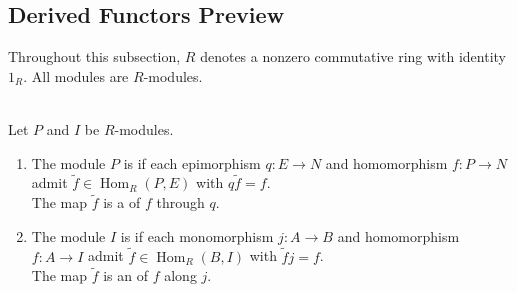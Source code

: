 \subsection{Derived Functors Preview}

Throughout this subsection, $R$ denotes a nonzero commutative ring with identity $1_R$. All modules are $R$-modules.

\begin{definition} \label{def:projective-injective-modules} \\
Let $P$ and $I$ be $R$-modules.
\begin{enumerate}[label=(\roman*)]
\setlength{\itemsep}{0pt}
\item The module $P$ is  if each epimorphism $q:E\to N$ and homomorphism $f:P\to N$ admit $\widetilde f\in\operatorname{Hom}_R(P,E)$ with $q\widetilde f=f$.\\
The map $\widetilde f$ is a  of $f$ through $q$.
\item The module $I$ is  if each monomorphism $j:A\to B$ and homomorphism $f:A\to I$ admit $\widetilde f\in\operatorname{Hom}_R(B,I)$ with $\widetilde f j=f$.\\
The map $\widetilde f$ is an  of $f$ along $j$.
\end{enumerate}
\end{definition}

